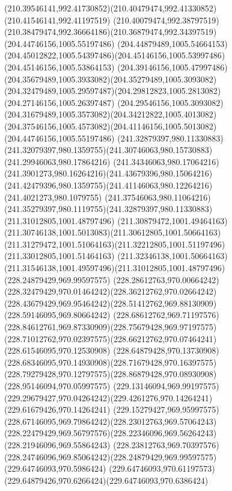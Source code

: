 {    \curveto(210.39546141,992.41730852)(210.40479474,992.41330852)(210.41546141,992.41197519)
    \curveto(210.40079474,992.38797519)(210.38479474,992.36664186)(210.36879474,992.34397519)
    \moveto(204.44746156,1005.55197486)
    \curveto(204.44879489,1005.54664153)(204.45012822,1005.54397486)(204.45146156,1005.53997486)
    \lineto(204.45146156,1005.53864153)
    \curveto(204.39146156,1005.47997486)(204.35679489,1005.3933082)(204.35279489,1005.3093082)
    \curveto(204.32479489,1005.29597487)(204.29812823,1005.2813082)(204.27146156,1005.26397487)
    \curveto(204.29546156,1005.3093082)(204.31679489,1005.3573082)(204.34212822,1005.4013082)
    \curveto(204.37546156,1005.4573082)(204.41146156,1005.5013082)(204.44746156,1005.55197486)
    \moveto(241.32879397,980.11330883)
    \curveto(241.32079397,980.1359755)(241.30746063,980.15730883)(241.29946063,980.17864216)
    \curveto(241.34346063,980.17064216)(241.3901273,980.16264216)(241.43679396,980.15064216)
    \curveto(241.42479396,980.1359755)(241.41146063,980.12264216)(241.4021273,980.1079755)
    \curveto(241.37546063,980.11064216)(241.35279397,980.1119755)(241.32879397,980.11330883)
    \moveto(211.31012805,1001.48797496)
    \curveto(211.30879472,1001.49464163)(211.30746138,1001.5013083)(211.30612805,1001.50664163)
    \curveto(211.31279472,1001.51064163)(211.32212805,1001.51197496)(211.33012805,1001.51464163)
    \curveto(211.32346138,1001.50664163)(211.31546138,1001.49597496)(211.31012805,1001.48797496)
    \moveto(228.24879429,969.99597575)
    \curveto(228.28612763,970.00664242)(228.32479429,970.01464242)(228.36212762,970.02664242)
    \curveto(228.43679429,969.95464242)(228.51412762,969.88130909)(228.59146095,969.80664242)
    \curveto(228.68612762,969.71197576)(228.84612761,969.87330909)(228.75679428,969.97197575)
    \curveto(228.71012762,970.02397575)(228.66212762,970.07464241)(228.61546095,970.12530908)
    \curveto(228.64879428,970.13730908)(228.68346095,970.14930908)(228.71679428,970.16397575)
    \curveto(228.79279428,970.12797575)(228.86879428,970.08930908)(228.95146094,970.05997575)
    \curveto(229.13146094,969.99197575)(229.29679427,970.04264242)(229.4261276,970.14264241)
    \lineto(229.61679426,970.14264241)
    \curveto(229.15279427,969.95997575)(228.67146095,969.79864242)(228.23012763,969.57064243)
    \curveto(228.22479429,969.56797576)(228.22346096,969.56264243)(228.21946096,969.55864243)
    \curveto(228.23812763,969.70397576)(228.24746096,969.85064242)(228.24879429,969.99597575)
    \moveto(229.64746093,970.5986424)
    \curveto(229.64746093,970.61197573)(229.64879426,970.6266424)(229.64746093,970.6386424)
}
